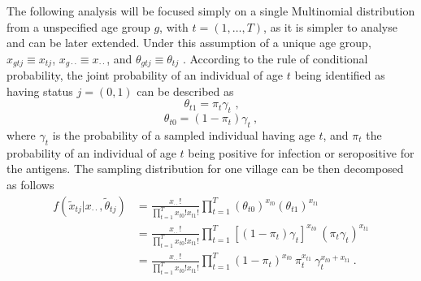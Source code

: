 The following analysis will be focused simply on a single Multinomial distribution from a unspecified age group $g$, with $t=(1,\dots,T)$, as it is simpler to analyse and can be later extended.
Under this assumption of a unique age group, $x_{gtj}\equiv x_{tj}$, $x_{g\cdot\cdot}\equiv x_{\cdot\cdot}$, and $\theta_{gtj}\equiv\theta_{tj}$ .
According to the rule of conditional probability, the joint probability of an individual of age $t$ being identified as having status $j=(0,1)$ can be described as
%
$$\theta_{t1} = \pi_t \gamma_t\text{\ ,}$$ $$\theta_{t0} = (1-\pi_t) \gamma_t\ ,$$
%
\noindent
where $\gamma_t$ is the probability of a sampled individual having age $t$, and $\pi_t$ the probability of an individual of age $t$ being positive for infection or seropositive for the antigens.
The sampling distribution for one village can be then decomposed as follows
%
\begin{equation}
    \label{eq:multinomial.distribution}
    \begin{split}
    f(\tilde{x}_{tj} | x_{\cdot\cdot}, \tilde{\theta}_{tj}) & = \frac{x_{\cdot\cdot}!}{\prod_{t=1}^T x_{t0}!x_{t1}!} \prod_{t=1}^T (\theta_{t0})^{x_{t0}} (\theta_{t1})^{x_{t1}} \\
    & = \frac{x_{\cdot\cdot}!}{\prod_{t=1}^T x_{t0}!x_{t1}!} \prod_{t=1}^T [(1-\pi_t)\gamma_t]^{x_{t0}} \ (\pi_t \gamma_t)^{x_{t1}} \\
    & = \frac{x_{\cdot\cdot}!}{\prod_{t=1}^T x_{t0}!x_{t1}!} \prod_{t=1}^T (1-\pi_t)^{x_{t0}} \ \pi_t^{x_{t1}} \ \gamma_t^{x_{t0}+x_{t1}}\ .
    \end{split}
\end{equation}

